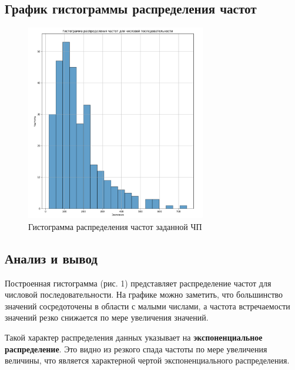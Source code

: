 \subsection{График гистограммы распределения частот}

\FloatBarrier
\begin{figure}[h]
	\centering
	\includegraphics[width=0.7\textwidth]{../data/histogram.png}
	\caption{Гистограмма распределения частот заданной ЧП}
\end{figure}
\FloatBarrier

\subsection{Анализ и вывод}

Построенная гистограмма (рис. 1) представляет распределение частот для числовой последовательности. На графике можно заметить, что большинство значений сосредоточены в области с малыми числами, а частота встречаемости значений резко снижается по мере увеличения значений.

Такой характер распределения данных указывает на \textbf{экспоненциальное распределение}. Это видно из резкого спада частоты по мере увеличения величины, что является характерной чертой экспоненциального распределения.

